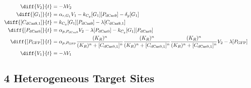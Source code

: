\begin{align}
\diff{\constructGen{2}}{t} & = - \dilutionRate{}\constructGen{2}\\
\diff{\conc{\gRna{1}}}{t} & =  \txRate{\gRna{1}}\constructGen{1} - \gRnaBind{}\conc{\gRna{1}}\conc{\proSp{\cas{}}} - \rnaDegradeRate{}\conc{\gRna{1}}\\
\diff{\conc{\cplx{\cas}{1}}}{t} & =  \gRnaBind{}\conc{\gRna{1}}\conc{\proSp{\cas{}}} - \dilutionRate{}\conc{\cplx{\cas}{1}}\\
\diff{\conc{\proSp{\cas{}}}}{t} & =  \txtlRate{\proSp{\cas{}}}\constructGen{2} - \dilutionRate{}\conc{\proSp{\cas{}}} - \gRnaBind{}\conc{\gRna{1}}\conc{\proSp{\cas{}}}\\
\diff{\conc{\proSp{\gfp}}}{t} & =  \txtlRate{\proSp{\gfp}}\frac{(K_R)^n}{(K_R)^n + \conc{\cplx{\cas}{1}}^n}\frac{(K_R)^n}{(K_R)^n + \conc{\cplx{\cas}{1}}^n}\frac{(K_R)^n}{(K_R)^n + \conc{\cplx{\cas}{1}}^n}\constructGen{2} - \dilutionRate{}\conc{\proSp{\gfp}}\\
\diff{\constructGen{1}}{t} & = - \dilutionRate{}\constructGen{1}
\end{align}

\subsection{4 Heterogeneous Target Sites}
\label{s:Multiplexed_4_gRNA_Repression}

